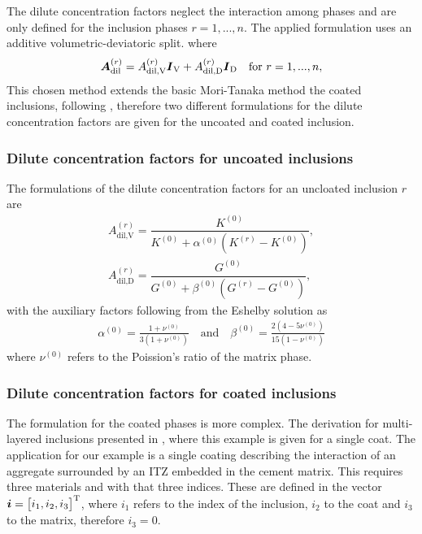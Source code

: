 The dilute concentration factors neglect the interaction among phases and are only defined for the inclusion phases $r = 1,...,n$.
The applied formulation uses an additive volumetric-deviatoric split. where
\begin{align}
	\boldsymbol{A}^{(r)}_{\text{dil}} = A^{(r)}_{\text{dil,V}}\boldsymbol{I}_{\text{V}} +  A^{(r)}_{\text{dil,D}} \boldsymbol{I}_{\text{D}} \quad  \text{for}~ r = 1, ..., n,
\end{align}
This chosen method extends the basic Mori-Tanaka method the coated inclusions, following \cite{her_1993_nlib}, therefore two different formulations for the dilute concentration factors are given for the uncoated and coated inclusion. 

\subsubsection{Dilute concentration factors for uncoated inclusions}
The formulations of the dilute concentration factors for an uncloated inclusion $r$ are
\begin{align}
	A^{(r)}_{\text{dil,V}} = \dfrac{K^{(0)}}{K^{(0)} + \alpha^{(0)}(K^{(r)} - K^{(0)})}, \\
	A^{(r)}_{\text{dil,D}} = \dfrac{G^{(0)}}{G^{(0)} + \beta^{(0)}(G^{(r)} - G^{(0)})}, 
\end{align}
with the auxiliary factors following from the Eshelby solution as
\begin{align}
	\alpha^{(0)} = \frac{1 + \nu^{(0)}}{3(1+ \nu^{(0)})} \quad\text{and}\quad 
	\beta^{(0)} = \frac{2(4 - 5\nu^{(0)})}{15(1 - \nu^{(0)})}
\end{align}
where  $\nu^{(0)}$ refers to the Poission's ratio of the matrix phase.
\subsubsection{Dilute concentration factors for coated inclusions}
The formulation for the coated phases is more complex. 
The derivation for multi-layered inclusions presented in \cite{her_1993_nlib}, where this example is given for a single coat.
The application for our example is a single coating describing the interaction of an aggregate surrounded by an ITZ embedded in the cement matrix.
This requires three materials and with that three indices.
These are defined in the vector $\boldsymbol{i} =\begin{bmatrix} i_1,i_2,i_3\end{bmatrix}^{\text{T}}$, where $i_1$ refers to the index of the inclusion, $i_2$ to the coat and $i_3$ to the matrix, therefore $i_3 = 0$.


